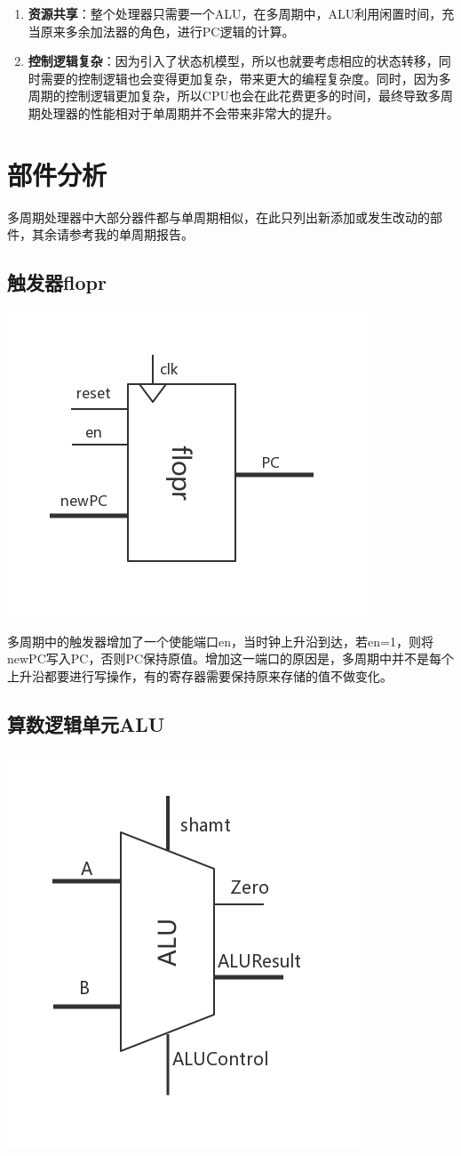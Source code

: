 \documentclass[12pt]{article} %
\begin{document}
\begin{sloppypar}
\begin{enumerate}
\item {\bf 资源共享}：整个处理器只需要一个ALU，在多周期中，ALU利用闲置时间，充当原来多余加法器的角色，进行PC逻辑的计算。

\item {\bf 控制逻辑复杂}：因为引入了状态机模型，所以也就要考虑相应的状态转移，同时需要的控制逻辑也会变得更加复杂，带来更大的编程复杂度。同时，因为多周期的控制逻辑更加复杂，所以CPU也会在此花费更多的时间，最终导致多周期处理器的性能相对于单周期并不会带来非常大的提升。
\end{enumerate}

\newpage
\section{部件分析}

多周期处理器中大部分器件都与单周期相似，在此只列出新添加或发生改动的部件，其余请参考我的单周期报告。

\subsection{触发器flopr}

\includegraphics[width =0.35\linewidth]{figure/flopr.jpg}

多周期中的触发器增加了一个使能端口en，当时钟上升沿到达，若en=1，则将newPC写入PC，否则PC保持原值。增加这一端口的原因是，多周期中并不是每个上升沿都要进行写操作，有的寄存器需要保持原来存储的值不做变化。

\subsection{算数逻辑单元ALU}

\includegraphics[width =0.3\linewidth]{figure/ALU.jpg}


\end{sloppypar}
\end{document}
